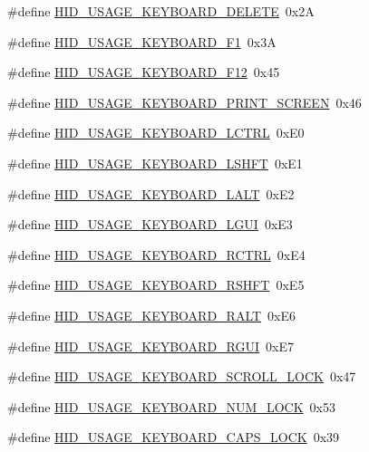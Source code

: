 \begin{DoxyCompactItemize}
\item 
\#define \hyperlink{group__USBD__HID_gaf1f78802de2995056015ce8dabf21efd}{H\+I\+D\+\_\+\+U\+S\+A\+G\+E\+\_\+\+K\+E\+Y\+B\+O\+A\+R\+D\+\_\+\+D\+E\+L\+E\+TE}~0x2A
\item 
\#define \hyperlink{group__USBD__HID_ga9ea2479fe9a71562a02bc3788b0df998}{H\+I\+D\+\_\+\+U\+S\+A\+G\+E\+\_\+\+K\+E\+Y\+B\+O\+A\+R\+D\+\_\+\+F1}~0x3A
\item 
\#define \hyperlink{group__USBD__HID_gaeb5ad09697c27e0982443080d198accd}{H\+I\+D\+\_\+\+U\+S\+A\+G\+E\+\_\+\+K\+E\+Y\+B\+O\+A\+R\+D\+\_\+\+F12}~0x45
\item 
\#define \hyperlink{group__USBD__HID_gad4754982a8d78739f7439a29ca8a8241}{H\+I\+D\+\_\+\+U\+S\+A\+G\+E\+\_\+\+K\+E\+Y\+B\+O\+A\+R\+D\+\_\+\+P\+R\+I\+N\+T\+\_\+\+S\+C\+R\+E\+EN}~0x46
\item 
\#define \hyperlink{group__USBD__HID_gae3b79c5b31060eabe7779b54cb164f6d}{H\+I\+D\+\_\+\+U\+S\+A\+G\+E\+\_\+\+K\+E\+Y\+B\+O\+A\+R\+D\+\_\+\+L\+C\+T\+RL}~0x\+E0
\item 
\#define \hyperlink{group__USBD__HID_ga294341928862609e496b3092d56141f4}{H\+I\+D\+\_\+\+U\+S\+A\+G\+E\+\_\+\+K\+E\+Y\+B\+O\+A\+R\+D\+\_\+\+L\+S\+H\+FT}~0x\+E1
\item 
\#define \hyperlink{group__USBD__HID_ga828bbc2e17dd2f1d57dbc35763af7e58}{H\+I\+D\+\_\+\+U\+S\+A\+G\+E\+\_\+\+K\+E\+Y\+B\+O\+A\+R\+D\+\_\+\+L\+A\+LT}~0x\+E2
\item 
\#define \hyperlink{group__USBD__HID_ga45a8236a486055442173a043f1e78b0e}{H\+I\+D\+\_\+\+U\+S\+A\+G\+E\+\_\+\+K\+E\+Y\+B\+O\+A\+R\+D\+\_\+\+L\+G\+UI}~0x\+E3
\item 
\#define \hyperlink{group__USBD__HID_gab288a000028dab0d7a6683d9d0e66991}{H\+I\+D\+\_\+\+U\+S\+A\+G\+E\+\_\+\+K\+E\+Y\+B\+O\+A\+R\+D\+\_\+\+R\+C\+T\+RL}~0x\+E4
\item 
\#define \hyperlink{group__USBD__HID_ga16c1d891765fa8aeede0394ca98fb87d}{H\+I\+D\+\_\+\+U\+S\+A\+G\+E\+\_\+\+K\+E\+Y\+B\+O\+A\+R\+D\+\_\+\+R\+S\+H\+FT}~0x\+E5
\item 
\#define \hyperlink{group__USBD__HID_gaf43e59f05daae6f0dcbc849464e2789c}{H\+I\+D\+\_\+\+U\+S\+A\+G\+E\+\_\+\+K\+E\+Y\+B\+O\+A\+R\+D\+\_\+\+R\+A\+LT}~0x\+E6
\item 
\#define \hyperlink{group__USBD__HID_ga556095c359b0a078bc0aa99cd78ab227}{H\+I\+D\+\_\+\+U\+S\+A\+G\+E\+\_\+\+K\+E\+Y\+B\+O\+A\+R\+D\+\_\+\+R\+G\+UI}~0x\+E7
\item 
\#define \hyperlink{group__USBD__HID_ga08cb9b6d6951f1d62d09cad92225beb6}{H\+I\+D\+\_\+\+U\+S\+A\+G\+E\+\_\+\+K\+E\+Y\+B\+O\+A\+R\+D\+\_\+\+S\+C\+R\+O\+L\+L\+\_\+\+L\+O\+CK}~0x47
\item 
\#define \hyperlink{group__USBD__HID_ga3e2e485b200dc9ce936ded0d045ff4b7}{H\+I\+D\+\_\+\+U\+S\+A\+G\+E\+\_\+\+K\+E\+Y\+B\+O\+A\+R\+D\+\_\+\+N\+U\+M\+\_\+\+L\+O\+CK}~0x53
\item 
\#define \hyperlink{group__USBD__HID_gaa75d2912123a694a9e0de0761a7d631b}{H\+I\+D\+\_\+\+U\+S\+A\+G\+E\+\_\+\+K\+E\+Y\+B\+O\+A\+R\+D\+\_\+\+C\+A\+P\+S\+\_\+\+L\+O\+CK}~0x39
\end{DoxyCompactItemize}
